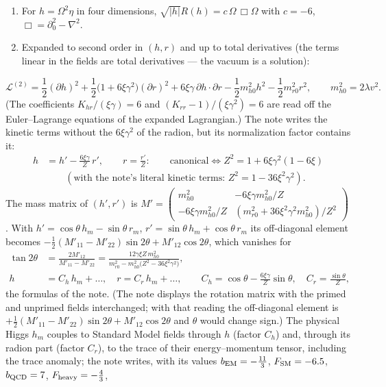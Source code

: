 \documentclass[10pt,a4paper]{article}
\begin{document}
\begin{enumerate}
\item For $h=\Omega^2\eta$ in four dimensions, $\sqrt{|h|}R(h)=c\,\Omega\,\Box\Omega$ with $c=-6$, $\Box=\partial_0^2-\nabla^2$.
\item Expanded to second order in $(h,r)$ and up to total derivatives (the terms linear in the fields are total derivatives — the vacuum is a solution):
\end{enumerate}
\begin{equation*}
\mathcal L^{(2)}=\frac12(\partial h)^2+\frac12\big(1+6\xi\gamma^2\big)(\partial r)^2+6\xi\gamma\,\partial h\cdot\partial r-\frac12m_{h0}^2h^2-\frac12m_{r0}^2r^2,\qquad m_{h0}^2=2\lambda v^2 .
\end{equation*}
(The coefficients $K_{hr}/(\xi\gamma)=6$ and $(K_{rr}-1)/(\xi\gamma^2)=6$ are read off the Euler–Lagrange equations of the expanded Lagrangian.) The note writes the kinetic terms without the $6\xi\gamma^2$ of the radion, but its normalization factor contains it:
\begin{align*}
h&=h'-\frac{6\xi\gamma}Z\,r',\qquad r=\frac{r'}Z:\qquad \text{canonical}\iff Z^2=1+6\xi\gamma^2(1-6\xi) \\
&\qquad(\text{with the note's literal kinetic terms: }Z^2=1-36\xi^2\gamma^2).
\end{align*}
The mass matrix of $(h',r')$ is $M'=\begin{pmatrix}m_{h0}^2&-6\xi\gamma m_{h0}^2/Z\\-6\xi\gamma m_{h0}^2/Z&(m_{r0}^2+36\xi^2\gamma^2m_{h0}^2)/Z^2\end{pmatrix}$. With $h'=\cos\theta\,h_m-\sin\theta\,r_m$, $r'=\sin\theta\,h_m+\cos\theta\,r_m$ its off-diagonal element becomes $-\frac12(M'_{11}-M'_{22})\sin2\theta+M'_{12}\cos2\theta$, which vanishes for
\begin{align*}
\tan2\theta&=\frac{2M'_{12}}{M'_{11}-M'_{22}}=\frac{12\gamma\xi Z\,m_{h0}^2}{m_{r0}^2-m_{h0}^2\big(Z^2-36\xi^2\gamma^2\big)}, \\
h&=C_h\,h_m+\dots,\quad r=C_r\,h_m+\dots,\qquad C_h=\cos\theta-\frac{6\xi\gamma}Z\sin\theta,\quad C_r=\frac{\sin\theta}Z,
\end{align*}
the formulas of the note. (The note displays the rotation matrix with the primed and unprimed fields interchanged; with that reading the off-diagonal element is $+\frac12(M'_{11}-M'_{22})\sin2\theta+M'_{12}\cos2\theta$ and $\theta$ would change sign.) The physical Higgs $h_m$ couples to Standard Model fields through $h$ (factor $C_h$) and, through its radion part (factor $C_r$), to the trace of their energy–momentum tensor, including the trace anomaly; the note writes, with its values $b_{\rm EM}=-\frac{11}3$, $F_{\rm SM}=-6.5$, $b_{\rm QCD}=7$, $F_{\rm heavy}=-\frac43$,
\end{document}
